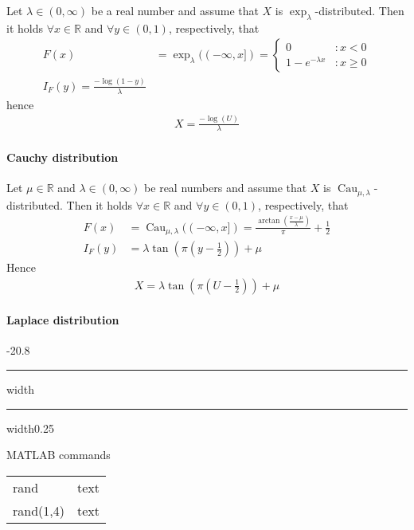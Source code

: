 \documentclass[a4paper,landscape,7pt,fleqn]{scrartcl}
\makeatletter
\renewcommand{\section}{\@startsection{section}{1}{0mm}%
{-2\baselineskip}{0.8\baselineskip}%
{\hrule depth 0.2pt width\columnwidth\hrule depth1.5pt
width0.25\columnwidth\vspace*{1.2em}\Large\bfseries}}
\DeclareMathOperator{\Cau}{Cau}				%
\makeatother
\begin{document}
\begin{multicols*}{3}
Let $\lambda \in (0,\infty)$ be a real number and assume that $X$ is $\exp_\lambda$-distributed. Then it holds $\forall x \in \mathbb{R}$ and $\forall y \in (0,1)$, respectively, that
\begin{align*}
F(x) &= \exp_\lambda((-\infty,x]) =
\begin{cases}
0 & : x < 0 \\
1-e^{-\lambda x} & : x \geq 0
\end{cases} \\
I_F(y) = \frac{-\log(1-y)}{\lambda}
\end{align*}
hence
\begin{align*}
X = \frac{-\log(U)}{\lambda}
\end{align*}

\paragraph{Cauchy distribution}

Let $\mu \in \mathbb{R}$ and $\lambda \in (0,\infty)$ be real numbers and assume that $X$ is $\Cau_{\mu,\lambda}$-distributed. Then it holds $\forall x \in \mathbb{R}$ and $\forall y \in (0,1)$, respectively, that
\begin{align*}
F(x) &= \Cau_{\mu,\lambda}((-\infty,x]) = \frac{\arctan \left( \frac{x - \mu}{\lambda} \right)}{\pi} + \frac{1}{2} \\
I_F(y) &= \lambda \tan \left( \pi \left( y - \frac{1}{2} \right) \right) + \mu
\end{align*}
Hence
\begin{align*}
X = \lambda \tan \left( \pi \left( U - \frac{1}{2} \right) \right) + \mu
\end{align*}

\paragraph{Laplace distribution}

\section{MATLAB commands}

\begin{tabular}{l l}
rand			&		text		\\
rand(1,4)	&		text		\\
\end{tabular}

\end{multicols*}
\end{document}
